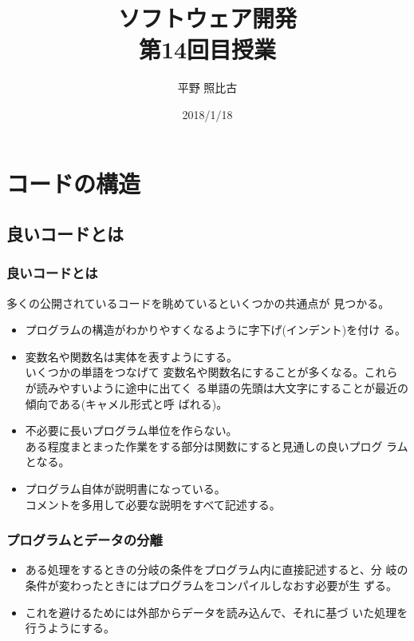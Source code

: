 
\title{ソフトウェア開発\\第14回目授業}
\author{平野 照比古}
\institute{}
\date{2018/1/18}
\newtheorem{Prob}{解説}
\newcommand{\Elm}[1]{\texttt{<#1>}}

\newcommand{\DOMM}{\texttt}
\newcommand{\Event}{\texttt}
\newcommand{\DOMP}{\texttt}
\newcommand{\DOM}{\texttt{DOM}}
\newcommand{\keyitem}{\relax}
\newcommand{\HTML}{HTML文書}

\frame{\maketitle}
\section{コードの構造}
\subsection{良いコードとは}
 \begin{frame}[containsverbatim]
  \frametitle{良いコードとは}
多くの公開されているコードを眺めているといくつかの共通点が
  見つかる。
\begin{itemize}
 \item プログラムの構造がわかりやすくなるように字下げ(インデント)を付け
			 る。
 \item 変数名や関数名は実体を表すようにする。\\いくつかの単語をつなげて
			 変数名や関数名にすることが多くなる。これらが読みやすいように途中に出てく
			 る単語の先頭は大文字にすることが最近の傾向である(キャメル形式と呼
			 ばれる)。
 \item 不必要に長いプログラム単位を作らない。\\
			 ある程度まとまった作業をする部分は関数にすると見通しの良いプログ
			 ラムとなる。
 \item プログラム自体が説明書になっている。\\
			 コメントを多用して必要な説明をすべて記述する。
\end{itemize}
 \end{frame}
 \begin{frame}[containsverbatim]
  \frametitle{プログラムとデータの分離}
  \begin{itemize}
   \item ある処理をするときの分岐の条件をプログラム内に直接記述すると、分
			 岐の条件が変わったときにはプログラムをコンパイルしなおす必要が生
         ずる。
   \item これを避けるためには外部からデータを読み込んで、それに基づ
			 いた処理を行うようにする。

  \end{itemize}
 \end{frame}
